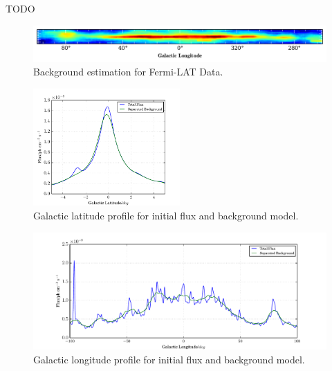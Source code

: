 \documentclass{PoS}
\begin{document}
TODO


\begin{table}
\centering
{}
\caption{Galactic plane fluxes for separated background from true Fermi-LAT data.}
\end{table}


\begin{figure}
  \begin{center}
      \includegraphics[width=\textwidth]{figures/BG_DATA.pdf}
  \caption{Background estimation for Fermi-LAT Data.}
  \end{center}
\end{figure}

\begin{figure}
  \begin{center}
      \includegraphics[width=0.5\textwidth]{figures/GLAT.pdf}
  \caption{Galactic latitude profile for initial flux and background model.}
  \end{center}
\end{figure}

\begin{figure}
  \begin{center}
      \includegraphics[width=\textwidth]{figures/GLON.pdf}
  \caption{Galactic longitude profile for initial flux and background model.}
  \end{center}
\end{figure}
\end{document}
